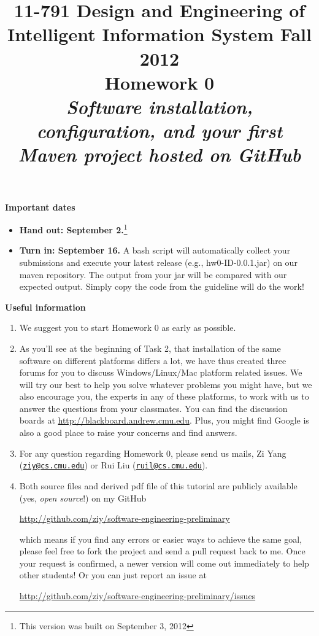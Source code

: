 \documentclass[oneside]{memoir}
\title{{\bfseries 11-791 Design and Engineering of Intelligent Information System Fall 2012\\Homework 0}\\
\vspace{1em}
\itshape\rmfamily Software installation, configuration, and your first Maven project hosted on GitHub}
\date{}
\begin{document}
\begin{titlingpage}
\maketitle

\hspace{-0.1\textwidth}
\begin{minipage}{1.2\textwidth}
\vspace{-5em}
\textbf{Important dates}
\begin{itemize}
\item \textbf{Hand out: September 2.}\footnote{This version was built on September 3, 2012}
\item \textbf{Turn in: September 16.} A bash script will automatically collect your submissions and execute your latest release (e.g., hw0-ID-0.0.1.jar) on our maven repository. The output from your jar will be compared with our expected output. Simply copy the code from the guideline will do the work!
\end{itemize}

\textbf{Useful information}
\begin{enumerate}
\item We suggest you to start Homework 0 as early as possible.
\item As you'll see at the beginning of Task 2, that installation of the same software on different platforms differs a lot, we have thus created three forums for you to discuss Windows/Linux/Mac platform related issues. We will try our best to help you solve whatever problems you might have, but we also encourage you, the experts in any of these platforms, to work with us to answer the questions from your classmates. You can find the discussion boards at \url{http://blackboard.andrew.cmu.edu}. Plus, you might find Google is also a good place to raise your concerns and find answers.
\item For any question regarding Homework 0, please send us mails, Zi Yang (\href{mailto:ziy@cs.cmu.edu}{\nolinkurl{ziy@cs.cmu.edu}}) or Rui Liu (\href{mailto:ruil@cs.cmu.edu}{\nolinkurl{ruil@cs.cmu.edu}}).
\item Both source files and derived pdf file of this tutorial are publicly available (yes, \emph{open source}!) on my GitHub

\url{http://github.com/ziy/software-engineering-preliminary}

which means if you find any errors or easier ways to achieve the same goal, please feel free to fork the project and send a pull request back to me. Once your request is confirmed, a newer version will come out immediately to help other students! Or you can just report an issue at

\url{http://github.com/ziy/software-engineering-preliminary/issues}

\end{enumerate}

\end{minipage}
\hspace{-0.1\textwidth}
\end{titlingpage}






\end{document}
